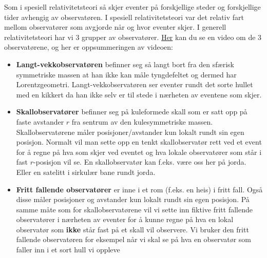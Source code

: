 \documentclass{beamer}
\let\hrefori\href
\renewcommand{\href}[2]{{\setlength{\fboxsep}{1pt}\colorbox{sunset}{\hrefori{#1}{#2}}}}
\newcommand{\pagebutton}[1]{\setbeamertemplate{button}{\tikz\node[inner xsep = 5pt, draw = structure!90, fill = green(ryb), rounded corners = 8pt]{\color{amber}\Large\insertbuttontext};}\beamerbutton{#1}}
\begin{document}
\begin{frame}
{
Som i spesiell relativitetsteori så skjer eventer på forskjellige steder og forskjellige tider avhengig av observatøren. I spesiell relativitetsteori var det relativ fart mellom observatører som avgjorde når og hvor eventer skjer. I generell relativitetsteori har vi 3 grupper av observatører. \href{https://www.uio.no/studier/emner/matnat/astro/AST2000/h20/undervisningsmateriell/interaktive-forelesningsnotater/2c/videoer/video2c_2.mp4}{Her} kan du se en video om de 3 observatørene, og her er oppsummeringen av videoen:
\begin{itemize}
\item {\bf Langt-vekkobservatøren} befinner seg så langt bort fra den sfærisk symmetriske massen at han ikke kan måle tyngdefeltet og dermed har Lorentzgeometri. Langt-vekkobservatøren ser eventer rundt det sorte hullet med en kikkert da han ikke selv er til stede i nærheten av eventene som skjer.
\item {\bf Skallobservatører} befinner seg på kuleformede skall som er satt opp på faste avstander $r$ fra sentrum av den kulesymmetriske massen. Skallobservatørene måler posisjoner/avstander kun lokalt rundt sin egen posisjon. Normalt vil man sette opp en tenkt skallobservatør rett ved et event for å regne på hva som skjer ved eventet og hva lokale observatører som står i fast $r$-posisjon vil se. En skallobservatør kan f.eks. være oss her på jorda. Eller en satelitt i sirkulær bane rundt jorda.
\item {\bf Fritt fallende observatører} er inne i et rom (f.eks. en heis) i fritt fall. Også disse måler posisjoner og avstander kun lokalt rundt sin egen posisjon. På samme måte som for skallobservatørene vil vi sette inn fiktive fritt fallende observatører i nærheten av eventer for å kunne regne på hva en lokal observatør som {\bf ikke} står fast på et skall vil observere. Vi bruker den fritt fallende observatøren for eksempel når vi skal se på hva en observatør som faller inn i et sort hull vi oppleve
\end{itemize}
\hyperlink{obs6}{\pagebutton{SIDE 45/73/73}}}


\end{frame}
\end{document}
